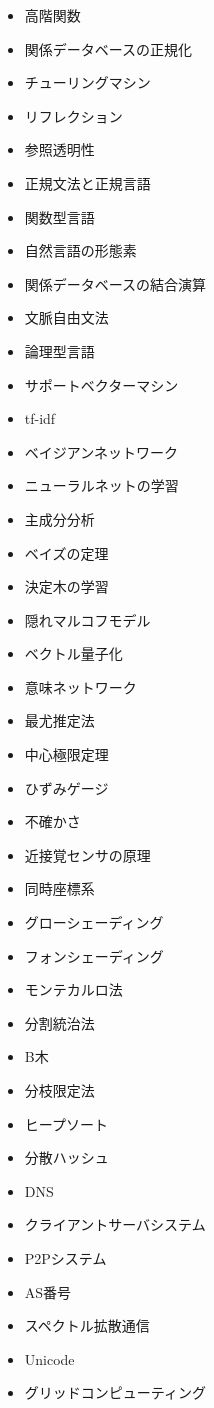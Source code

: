 \documentclass[a4j, titlepage, 11pt]{jsarticle}
\begin{document}
\begin{multicols}{2}
\begin{itemize}
	\item 高階関数
	\item 関係データベースの正規化
	\item チューリングマシン
	\item リフレクション
	\item 参照透明性
	\item 正規文法と正規言語
	\item 関数型言語
	\item 自然言語の形態素
	\item 関係データベースの結合演算
	\item 文脈自由文法
	\item 論理型言語
	\item サポートベクターマシン
	\item tf-idf
	\item ベイジアンネットワーク
	\item ニューラルネットの学習
	\item 主成分分析
	\item ベイズの定理
	\item 決定木の学習
	\item 隠れマルコフモデル
	\item ベクトル量子化
	\item 意味ネットワーク
	\item 最尤推定法
	\item 中心極限定理
	\item ひずみゲージ
	\item 不確かさ
	\item 近接覚センサの原理
	\item 同時座標系
	\item グローシェーディング
	\item フォンシェーディング
	\item モンテカルロ法
	\item 分割統治法
	\item B木
	\item 分枝限定法
	\item ヒープソート
	\item 分散ハッシュ
	\item DNS
	\item クライアントサーバシステム
	\item P2Pシステム
	\item AS番号
	\item スペクトル拡散通信
	\item Unicode
	\item グリッドコンピューティング

\end{itemize}
\end{multicols}
\end{document}
